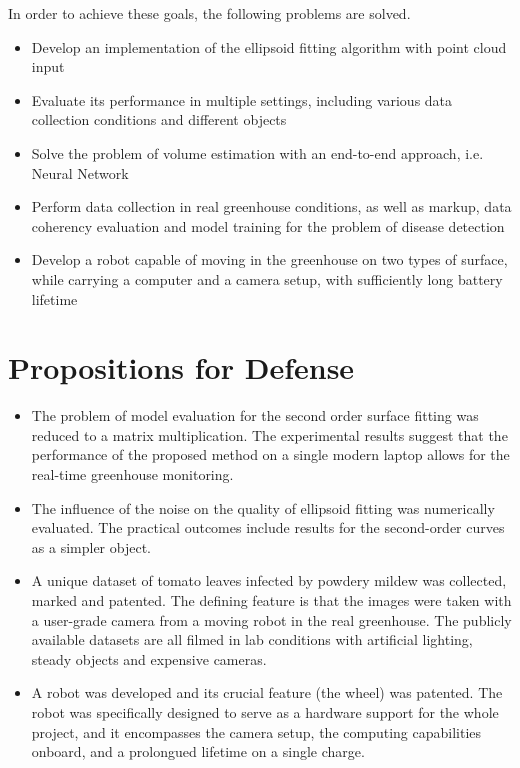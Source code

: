 In order to achieve these goals, the following problems are solved.

\begin{itemize}
    \item Develop an implementation of the ellipsoid fitting algorithm with point cloud input
    \item Evaluate its performance in multiple settings, including various data collection conditions and different objects
    \item Solve the problem of volume estimation with an end-to-end approach, i.e. Neural Network
    \item Perform data collection in real greenhouse conditions, as well as markup, data coherency evaluation and model training for the problem of disease detection
    \item Develop a robot capable of moving in the greenhouse on two types of surface, while carrying a computer and a camera setup, with sufficiently long battery lifetime
\end{itemize}

\section{Propositions for Defense}

\begin{itemize}
    \item The problem of model evaluation for the second order surface fitting was reduced to a matrix multiplication. The experimental results suggest that the performance of the proposed method on a single modern laptop allows for the real-time greenhouse monitoring.
    \item The influence of the noise on the quality of ellipsoid fitting was numerically evaluated. The practical outcomes include results for the second-order curves as a simpler object.
    \item A unique dataset of tomato leaves infected by powdery mildew was collected, marked and patented. The defining feature is that the images were taken with a user-grade camera from a moving robot in the real greenhouse. The publicly available datasets are all filmed in lab conditions with artificial lighting, steady objects and expensive cameras.
    \item A robot was developed and its crucial feature (the wheel) was patented. The robot was specifically designed to serve as a hardware support for the whole project, and it encompasses the camera setup, the computing capabilities onboard, and a prolongued lifetime on a single charge.
\end{itemize}

